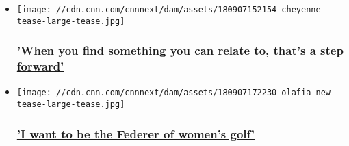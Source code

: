 \begin{itemize}
\item
  \href{/2018/09/10/golf/cheyenne-woods-tiger-woods-lpga-golf-spt-intl/index.html}{}

  \texttt{[image: //cdn.cnn.com/cnnnext/dam/assets/180907152154-cheyenne-tease-large-tease.jpg]}

  \hypertarget{when-you-find-something-you-can-relate-to-thats-a-step-forward}{%
  \subsubsection{\texorpdfstring{\href{/2018/09/10/golf/cheyenne-woods-tiger-woods-lpga-golf-spt-intl/index.html}{'When
  you find something you can relate to, that's a step
  forward'}}{'When you find something you can relate to, that's a step forward'}}\label{when-you-find-something-you-can-relate-to-thats-a-step-forward}}
\end{itemize}

\begin{itemize}
\item
  \href{/2018/09/12/golf/olafia-kristinsdottir-golf-iceland-spt-intl/index.html}{}

  \texttt{[image: //cdn.cnn.com/cnnnext/dam/assets/180907172230-olafia-new-tease-large-tease.jpg]}

  \hypertarget{i-want-to-be-the-federer-of-womens-golf}{%
  \subsubsection{\texorpdfstring{\href{/2018/09/12/golf/olafia-kristinsdottir-golf-iceland-spt-intl/index.html}{'I
  want to be the Federer of women's
  golf'}}{'I want to be the Federer of women's golf'}}\label{i-want-to-be-the-federer-of-womens-golf}}
\end{itemize}

\hypertarget{-}{%
\subsection{~}\label{-}}

